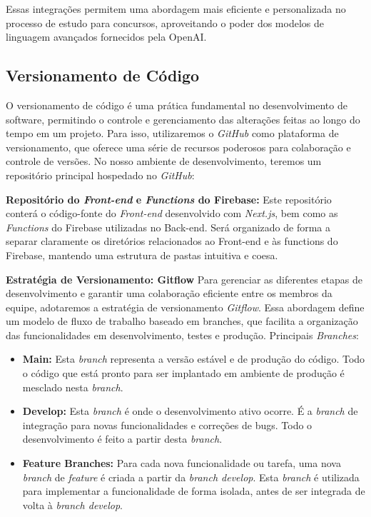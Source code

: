 Essas integrações permitem uma abordagem mais eficiente e personalizada no processo de estudo para concursos, aproveitando o poder dos modelos de linguagem avançados fornecidos pela OpenAI.

\subsection{Versionamento de Código}
O versionamento de código é uma prática fundamental no desenvolvimento de software, permitindo o controle e gerenciamento das alterações feitas ao longo do tempo em um projeto. Para isso, utilizaremos o \textit{GitHub} como plataforma de versionamento, que oferece uma série de recursos poderosos para colaboração e controle de versões. No nosso ambiente de desenvolvimento, teremos um repositório principal hospedado no \textit{GitHub}:

\textbf{Repositório do \textit{Front-end} e \textit{Functions} do Firebase:} \newline
Este repositório conterá o código-fonte do \textit{Front-end} desenvolvido com \textit{Next.js}, bem como as \textit{Functions} do Firebase utilizadas no Back-end. Será organizado de forma a separar claramente os diretórios relacionados ao Front-end e às functions do Firebase, mantendo uma estrutura de pastas intuitiva e coesa.

\textbf{Estratégia de Versionamento: Gitflow} \newline
Para gerenciar as diferentes etapas de desenvolvimento e garantir uma colaboração eficiente entre os membros da equipe, adotaremos a estratégia de versionamento \textit{Gitflow}. Essa abordagem define um modelo de fluxo de trabalho baseado em branches, que facilita a organização das funcionalidades em desenvolvimento, testes e produção.
Principais \textit{Branches}:

\begin{itemize}
\item \textbf{Main:} Esta \textit{branch} representa a versão estável e de produção do código. Todo o código que está pronto para ser implantado em ambiente de produção é mesclado nesta \textit{branch}.

\item \textbf{Develop:} Esta \textit{branch} é onde o desenvolvimento ativo ocorre. É a \textit{branch} de integração para novas funcionalidades e correções de bugs. Todo o desenvolvimento é feito a partir desta \textit{branch}.

\item \textbf{Feature Branches:} Para cada nova funcionalidade ou tarefa, uma nova \textit{branch} de \textit{feature} é criada a partir da \textit{branch develop}. Esta \textit{branch} é utilizada para implementar a funcionalidade de forma isolada, antes de ser integrada de volta à \textit{branch develop}.
\end{itemize}
 
